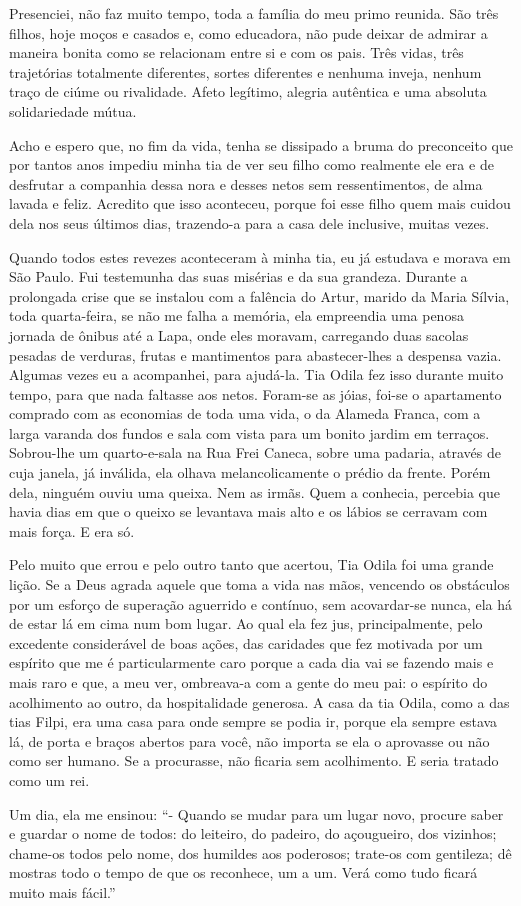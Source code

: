 Presenciei, não faz muito tempo, toda a família do meu primo reunida.
São três filhos, hoje moços e casados e, como educadora, não pude deixar de admirar a maneira bonita como se relacionam entre si e com os pais.
Três vidas, três trajetórias totalmente diferentes, sortes diferentes e nenhuma inveja, nenhum traço de ciúme ou rivalidade.
Afeto legítimo, alegria autêntica e uma absoluta solidariedade mútua.

Acho e espero que, no fim da vida, tenha se dissipado a bruma do preconceito que por tantos anos impediu minha tia de ver seu filho como realmente ele era e de desfrutar a companhia dessa nora e desses netos sem ressentimentos, de alma lavada e feliz.
Acredito que isso aconteceu, porque foi esse filho quem mais cuidou dela nos seus últimos dias, trazendo-a para a casa dele inclusive, muitas vezes.

 
Quando todos estes revezes aconteceram à minha tia, eu já estudava e morava em São Paulo.
Fui testemunha das suas misérias e da sua grandeza.
Durante a prolongada crise que se instalou com a falência do Artur, marido da Maria Sílvia, toda quarta-feira, se não me falha a memória, ela empreendia uma penosa jornada de ônibus até a Lapa, onde eles moravam, carregando duas sacolas pesadas de verduras, frutas e mantimentos para abastecer-lhes a despensa vazia.
Algumas vezes eu a acompanhei, para ajudá-la.
Tia Odila fez isso durante muito tempo, para que nada faltasse aos netos.
Foram-se as jóias, foi-se o apartamento comprado com as economias de toda uma vida, o da Alameda Franca, com a larga varanda dos fundos e sala com vista para um bonito jardim em terraços.
Sobrou-lhe um quarto-e-sala na Rua Frei Caneca, sobre uma padaria, através de cuja janela, já inválida, ela olhava melancolicamente o prédio da frente.
Porém dela, ninguém ouviu uma queixa.
Nem as irmãs.
Quem a conhecia, percebia que havia dias em que o queixo se levantava mais alto e os lábios se cerravam com mais força.
E era só.
 

Pelo muito que errou e pelo outro tanto que acertou, Tia Odila foi uma grande lição.
Se a Deus agrada aquele que toma a vida nas mãos, vencendo os obstáculos por um esforço de superação aguerrido e contínuo, sem acovardar-se nunca, ela há de estar lá em cima num bom lugar.
Ao qual ela fez jus, principalmente, pelo excedente considerável de boas ações, das caridades que fez motivada por um espírito que me é particularmente caro porque a cada dia vai se fazendo mais e mais raro e que, a meu ver, ombreava-a com a gente do meu pai: o espírito do acolhimento ao outro, da hospitalidade generosa.
A casa da tia Odila, como a das tias Filpi, era uma casa para onde sempre se podia ir, porque ela sempre estava lá, de porta e braços abertos para você, não importa se ela o aprovasse ou não como ser humano.
Se a procurasse, não ficaria sem acolhimento.
E seria tratado como um rei.


Um dia, ela me ensinou: 
“- Quando se mudar para um lugar novo, procure saber e guardar o nome de todos: do leiteiro, do padeiro, do açougueiro, dos vizinhos; chame-os todos pelo nome, dos humildes aos poderosos; trate-os com gentileza; dê mostras todo o tempo de que os reconhece, um a um.
Verá como tudo ficará muito mais fácil.” 
